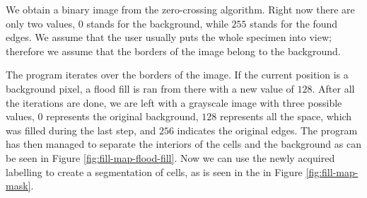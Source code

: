 \documentclass[
  digital,     %
  oneside,     %
  nosansbold,  %
  nocolorbold, %
  lof,         %
  lot,         %
]{fithesis4}
\begin{document}
We obtain a binary image from the zero-crossing algorithm. Right now there are
only two values, $0$ stands for the background, while $255$ stands for the found
edges. We assume that the user usually puts the whole specimen into view;
therefore we assume that the borders of the image belong to the background.

The program iterates over the borders of the image. If the current position is
a background pixel, a flood fill is ran from there with a new value of $128$.
After all the iterations are done, we are left with a grayscale
image with three possible values, $0$ represents the original background, $128$
represents all the space, which was filled during the last step, and $256$
indicates the original edges. The program has then managed to separate the interiors of
the cells and the background as can be seen in Figure
\ref{fig:fill-map-flood-fill}. Now we can use the newly acquired labelling to
create a segmentation of cells, as is seen in the in Figure
\ref{fig:fill-map-mask}.
\end{document}
